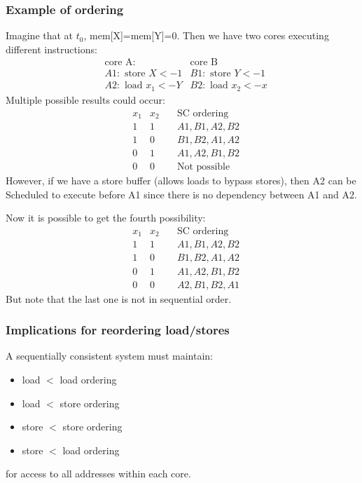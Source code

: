 \documentclass[letterpaper,12pt]{article}
\begin{document}
\subsubsection{Example of ordering}
Imagine that at $t_0$, mem[X]=mem[Y]=0. Then we have two cores executing different instructions:\begin{align*}
     & \text{core A:}        & \text{core B}           \\
     & A1:\text{ store }X<-1 & B1: \text{ store }Y<-1  \\
     & A2:\text{ load }x_1<-Y & B2: \text{ load }x_2<-x
\end{align*}
Multiple possible results could occur:\begin{align*}
     & x_1 & x_2 \quad & \text{SC ordering}  \\
     & 1   & 1 \quad  & A1,B1,A2,B2         \\
     & 1   & 0 \quad  & B1,B2,A1,A2         \\
     & 0   & 1 \quad  & A1,A2,B1,B2         \\
     & 0   & 0 \quad  & \text{Not possible}
\end{align*}
However, if we have a store buffer (allows loads to bypass stores), then A2 can be Scheduled to execute before A1 since there is no dependency between A1 and A2.

Now it is possible to get the fourth possibility:\begin{align*}
     & x_1 & x_2 \quad & \text{SC ordering} \\
     & 1   & 1 \quad  & A1,B1,A2,B2        \\
     & 1   & 0 \quad  & B1,B2,A1,A2        \\
     & 0   & 1 \quad  & A1,A2,B1,B2        \\
     & 0   & 0 \quad  & A2,B1,B2,A1
\end{align*}
But note that the last one is not in sequential order.
\subsubsection{Implications for reordering load/stores}
A sequentially consistent system must maintain:\begin{itemize}
    \item load $<$ load ordering
    \item load $<$ store ordering
    \item store $<$ store ordering
    \item store $<$ load ordering
\end{itemize}
for access to all addresses within each core.
\end{document}
